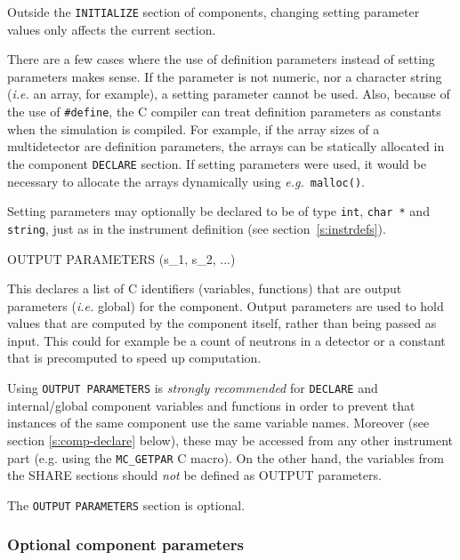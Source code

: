 Outside the \verb+INITIALIZE+ section of components, changing setting parameter
values only affects the current section.

There are a few cases where the use of definition parameters instead of
setting parameters makes sense. If the parameter is not numeric, nor a character string ({\em i.e.} an
array, for example), a setting parameter cannot be
used. Also, because of the use of \verb+#define+, the C compiler can
treat definition parameters as constants when the simulation is
compiled. For example, if the array sizes of a multidetector are
definition parameters, the arrays can be statically allocated in the
component \verb+DECLARE+ section. If setting parameters were used, it
would be necessary to allocate the arrays dynamically using {\em e.g.}\
\verb+malloc()+.

Setting parameters may optionally be declared to be of type \verb+int+,
\verb+char *+ and \verb+string+, just as in the instrument definition (see
section~\ref{s:instrdefs}).

\begin{mcstas}
OUTPUT PARAMETERS (s_1, s_2, ...)
\end{mcstas}

This declares a list of C identifiers (variables, functions) that are
output parameters (\textit{i.e.} global) for the
component. Output parameters are used to hold values that are computed
by the component itself, rather than being passed as input. This could
for example be a count of neutrons in a detector or a constant that is
precomputed to speed up computation.

Using \texttt{OUTPUT PARAMETERS} is \emph{strongly recommended} for
\texttt{DECLARE} and internal/global component variables and functions in order
to prevent that instances of the same component use the same variable
names. Moreover (see section \ref{s:comp-declare} below), these may be accessed
from any other instrument part (e.g. using the \verb+MC_GETPAR+ C macro).  On
the other hand, the variables from the SHARE sections should \emph{not} be
defined as OUTPUT parameters.

The \texttt{OUTPUT} \texttt{PARAMETERS} section is optional.

\subsubsection{Optional component parameters}

